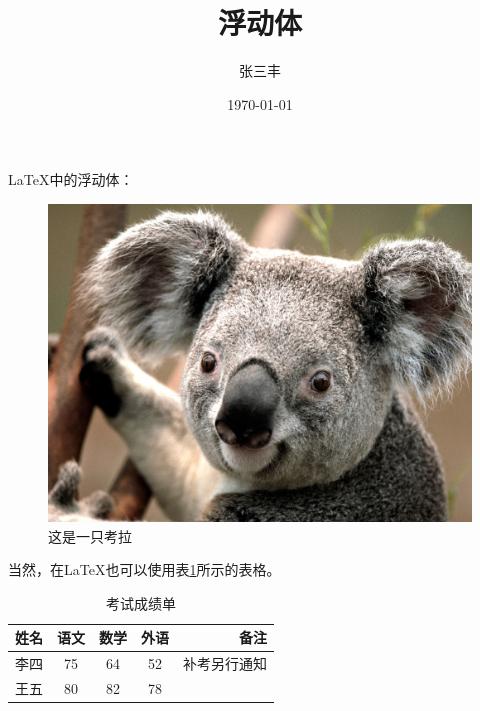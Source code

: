 \documentclass{article}
\title{浮动体}
\author{张三丰}
\date{\today}
\begin{document}
	\maketitle
	\LaTeX{}中的浮动体：
	\begin{figure}[h]
		\centering
		\includegraphics[scale=0.3]{Koala}
		\caption{这是一只考拉}
	\end{figure}
	
	当然，在\LaTeX{}也可以使用表\ref{tab-score}所示的表格。
	
	\begin{table}[h]
		\centering
		\caption{考试成绩单}\label{tab-score}
		\begin{tabular}{| l || c | c | c | r|}
			\hline %
			姓名 & 语文 & 数学 & 外语 & 备注 \\
			\hline \hline %
			李四 & 75 & 64 & 52 & 补考另行通知 \\
			\hline
			王五 & 80 & 82 &78 & \\
			\hline
		\end{tabular}
	\end{table}
\end{document}
